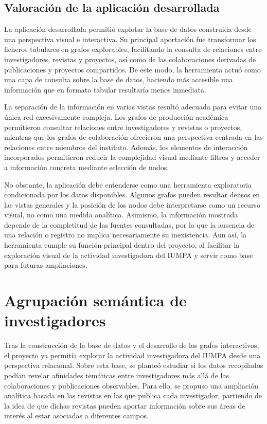 \documentclass[11pt,spanish,listoffigures,listoftables]{tfgetsinf}
\begin{document}
\section{Valoración de la aplicación desarrollada}

La aplicación desarrollada permitió explotar la base de datos construida desde una perspectiva visual e interactiva. Su principal aportación fue transformar los ficheros tabulares en grafos explorables, facilitando la consulta de relaciones entre investigadores, revistas y proyectos, así como de las colaboraciones derivadas de publicaciones y proyectos compartidos. De este modo, la herramienta actuó como una capa de consulta sobre la base de datos, haciendo más accesible una información que en formato tabular resultaría menos inmediata.

La separación de la información en varias vistas resultó adecuada para evitar una única red excesivamente compleja. Los grafos de producción académica permitieron consultar relaciones entre investigadores y revistas o proyectos, mientras que los grafos de colaboración ofrecieron una perspectiva centrada en las relaciones entre miembros del instituto. Además, los elementos de interacción incorporados permitieron reducir la complejidad visual mediante filtros y acceder a información concreta mediante selección de nodos.

No obstante, la aplicación debe entenderse como una herramienta exploratoria condicionada por los datos disponibles. Algunos grafos pueden resultar densos en las vistas generales y la posición de los nodos debe interpretarse como un recurso visual, no como una medida analítica. Asimismo, la información mostrada depende de la completitud de las fuentes consultadas, por lo que la ausencia de una relación o registro no implica necesariamente su inexistencia. Aun así, la herramienta cumple su función principal dentro del proyecto, al facilitar la exploración visual de la actividad investigadora del IUMPA y servir como base para futuras ampliaciones.



\chapter{Agrupación semántica de investigadores}

Tras la construcción de la base de datos y el desarrollo de los grafos interactivos, el proyecto ya permitía explorar la actividad investigadora del IUMPA desde una perspectiva relacional. Sobre esta base, se planteó estudiar si los datos recopilados podían revelar afinidades temáticas entre investigadores más allá de las colaboraciones y publicaciones observables. Para ello, se propuso una ampliación analítica basada en las revistas en las que publica cada investigador, partiendo de la idea de que dichas revistas pueden aportar información sobre sus áreas de interés al estar asociadas a diferentes campos.
\end{document}
